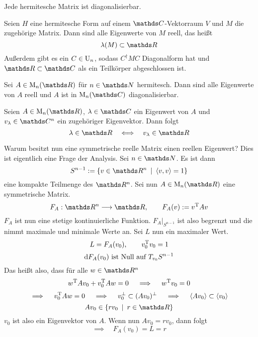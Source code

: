 			\begin{corollary}
				Jede hermitesche Matrix ist diagonalisierbar.
			\end{corollary}

			\begin{theorem}
				Seien $H$ eine hermitesche Form auf einem $\SC$-Vektorraum $V$ und $M$ die zugehörige Matrix.
				Dann sind alle Eigenwerte von $M$ reell, das heißt
				\[ \lambda(M)\subset\SR \]
				Außerdem gibt es ein $C\in\mathrm{U}_n$, sodass $C^\dagger M C$ Diagonalform hat und $\SR\subset\SC$ als ein Teilkörper abgeschlossen ist.
			\end{theorem}

			\begin{corollary}
				Sei $A\in\m{M}_n(\SR)$ für $n\in\SN$ hermitesch.
				Dann sind alle Eigenwerte von $A$ reell und $A$ ist in $\m{M}_n(\SC)$ diagonalisierbar.
			\end{corollary}

			Seien $A\in\m{M}_n(\SR)$, $\lambda\in\SC$ ein Eigenwert von $A$ und $v_\lambda\in\SC^n$ ein zugehöriger Eigenvektor.
			Dann folgt 
			\[ \lambda\in\SR \quad \equivalent \quad v_\lambda \in \SR \]

			Warum besitzt nun eine symmetrische reelle Matrix einen reellen Eigenwert?
			Dies ist eigentlich eine Frage der Analysis.
			Sei $n\in\SN$.
			Es ist dann
			\[ S^{n-1} := \set{v\in\SR^n}{\angleb{v,v}=1} \]
			eine kompakte Teilmenge des $\SR^n$.
			Sei nun $A\in\m{M}_n(\SR)$ eine symmetrische Matrix.
			\[ F_A:\SR^n \longrightarrow \SR,\qquad F_A(v):=v\transp A v \]
			$F_A$ ist nun eine stetige kontinuierliche Funktion.
			$F_A|_{S^{n-1}}$ ist also begrenzt und die nimmt maximale und minimale Werte an.
			Sei $L$ nun ein maximaler Wert.
			\[ L=F_A(v_0),\qquad v_0^\mathrm{T} v_0 = 1 \]
			\[ \mathrm{d} F_A(v_0) \text{ ist Null auf } T_{v_0}S^{n-1} \]
			Das heißt also, dass für alle $w\in\SR^n$
			\[ w^\mathrm{T} Av_0 + v_0^\mathrm{T} Aw = 0 \quad \implies \quad w^\mathrm{T} v_0 = 0 \]
			\[ \implies \quad v_0^\mathrm{T} Aw = 0 \quad \implies \quad v_0^\perp \subset (Av_0)^\perp \quad \implies \quad \left\langle Av_0 \right\rangle\subset\left\langle v_0 \right\rangle \]
			\[ Av_0 \in \set{rv_0}{r\in\SR} \]
			$v_0$ ist also ein Eigenvektor von $A$.
			Wenn nun $Av_0 = rv_0$, dann folgt
			\[ \implies \quad F_A(v_0) = L = r \]

